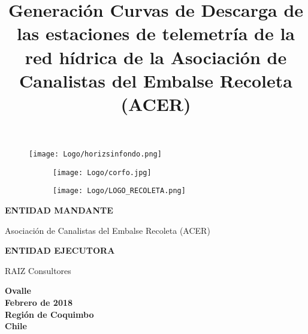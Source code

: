 \documentclass[]{article}
\title{Generación Curvas de Descarga de las estaciones de telemetría de la red hídrica de la Asociación de Canalistas del Embalse Recoleta (ACER)}
\author{}
\date{}
\begin{document}
\sloppy 

\begin{titlepage}

\begin{figure}
 \centering \vspace*{1in}
  \texttt{[image: Logo/horizsinfondo.png]}
  \vspace*{1in}
\end{figure}
\maketitle \thispagestyle{empty} \vspace*{2.5in}
\begin{center}
    \fontsize{14}{0} \selectfont{Febrero 2018}
\end{center}

\begin{figure}
  \centering
\begin{subfigure}{.2\textwidth}
  \texttt{[image: Logo/corfo.jpg]}
\end{subfigure}
\hfill
\begin{subfigure}{.2\textwidth}
  \texttt{[image: Logo/LOGO\_RECOLETA.png]}
\end{subfigure}

\end{figure}

\end{titlepage}

\begin{titlepage}


\textbf{ENTIDAD MANDANTE } 

\vspace*{.1in} Asociación de Canalistas del Embalse Recoleta (ACER)\vspace*{.4in} 

\textbf{ENTIDAD EJECUTORA} 

\vspace*{.1in} RAIZ Consultores

\vfill \textbf{Ovalle}
\\ \textbf{Febrero de 2018} 
\\ \textbf{Región de Coquimbo}
\\ \textbf{Chile} 

\end{titlepage}

\newpage 
\end{document}
